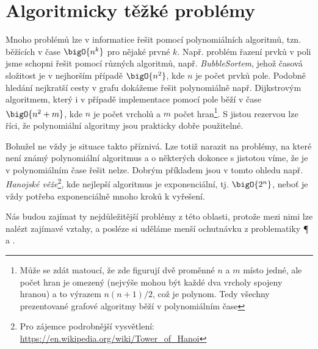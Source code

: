 \chapter{Algoritmicky těžké problémy}\label{chap:tezke-problemy}

Mnoho problémů lze v informatice řešit pomocí polynomiálních algoritmů, tzn. běžících v čase $\bigO{n^k}$ pro nějaké prvné $k$. Např. problém řazení prvků v poli jsme schopni řešit pomocí různých algoritmů, např. \emph{BubbleSortem}, jehož časová složitost je v nejhorším případě $\bigO{n^2}$, kde $n$ je počet prvků pole. Podobně hledání nejkratší cesty v grafu dokážeme řešit polynomiálně např. Dijkstrovým algoritmem, který i v případě implementace pomocí pole běží v čase $\bigO{n^2+m}$, kde $n$ je počet vrcholů a $m$ počet hran\footnote{Může se zdát matoucí, že zde figurují dvě proměnné $n$ a $m$ místo jedné, ale počet hran je omezený (nejvýše mohou být každé dva vrcholy spojeny hranou) a to výrazem $n(n+1)/2$, což je polynom. Tedy všechny prezentované grafové algoritmy běží v polynomiálním čase}. S jistou rezervou lze říci, že polynomiální algoritmy jsou prakticky dobře použitelné.

Bohužel ne vždy je situace takto příznivá. Lze totiž narazit na problémy, na které není známý polynomiální algoritmus a o některých dokonce s jistotou víme, že je v polynomiálním čase řešit nelze. Dobrým příkladem jsou v tomto ohledu např. \emph{Hanojské věže}\footnote{Pro zájemce podrobnější vysvětlení: \url{https://en.wikipedia.org/wiki/Tower_of_Hanoi}}, kde nejlepší algoritmus je exponenciální, tj. $\bigO{2^n}$, neboť je vždy potřeba exponenciálně mnoho kroků k vyřešení.

Nás budou zajímat ty nejdůležitější problémy z této oblasti, protože mezi nimi lze nalézt zajímavé vztahy, a posléze si uděláme menší ochutnávku z problematiky \P{} a \NP.






